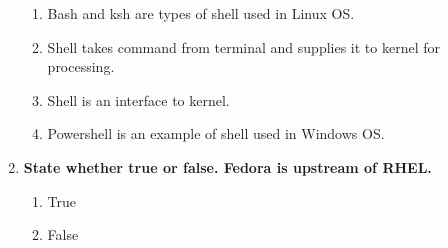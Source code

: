 \begin{flushleft}
\begin{enumerate}
\begin{enumerate}[label=(\alph*)]
			\item Bash and ksh are types of shell used in Linux OS.  %
			\item Shell takes command from terminal and supplies it to kernel for processing.  %
			\item Shell is an interface to kernel. %
			\item Powershell is an example of shell used in Windows OS.  %
		\end{enumerate}
		\bigskip
		\bigskip
		\item \textbf{State whether true or false. Fedora is upstream of RHEL.}
		\begin{enumerate}[label=(\alph*)]
			\item True   %
			\item False   
		\end{enumerate}
	\end{enumerate}

	
\end{flushleft}
\newpage


